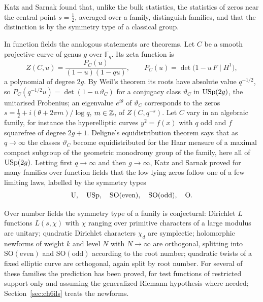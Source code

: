 Katz and Sarnak \cite{katzsarnak1999,katzsarnak1999b} found that, unlike the bulk statistics, the statistics of zeros near the central point $s=\frac12$, averaged over a family, distinguish families, and that the distinction is by the symmetry type of a classical group.

In function fields the analogous statements are theorems. Let $C$ be a smooth projective curve of genus $g$ over $\mathbb{F}_q$. Its zeta function is
\[
Z(C,u)=\frac{P_C(u)}{(1-u)(1-qu)},\qquad P_C(u)=\det\bigl(1-u\,F\mid H^1\bigr),
\]
a polynomial of degree $2g$. By Weil's theorem its roots have absolute value $q^{-1/2}$, so $P_C(q^{-1/2}u)=\det(1-u\,\vartheta_C)$ for a conjugacy class $\vartheta_C$ in $\mathrm{USp}(2g)$, the unitarised Frobenius; an eigenvalue $e^{i\theta}$ of $\vartheta_C$ corresponds to the zeros $s=\frac12+i(\theta+2\pi m)/\log q$, $m\in\mathbb{Z}$, of $Z(C,q^{-s})$. Let $C$ vary in an algebraic family, for instance the hyperelliptic curves $y^2=f(x)$ with $q$ odd and $f$ squarefree of degree $2g+1$. Deligne's equidistribution theorem \cite{deligne1980} says that as $q\to\infty$ the classes $\vartheta_C$ become equidistributed for the Haar measure of a maximal compact subgroup of the geometric monodromy group of the family, here all of $\mathrm{USp}(2g)$. Letting first $q\to\infty$ and then $g\to\infty$, Katz and Sarnak proved for many families over function fields that the low lying zeros follow one of a few limiting laws, labelled by the symmetry types
\[
\mathrm{U},\quad\mathrm{USp},\quad\mathrm{SO(even)},\quad\mathrm{SO(odd)},\quad\mathrm{O}.
\]

Over number fields the symmetry type of a family is conjectural: Dirichlet $L$ functions $L(s,\chi)$ with $\chi$ ranging over primitive characters of a large modulus are unitary; quadratic Dirichlet characters $\chi_d$ are symplectic; holomorphic newforms of weight $k$ and level $N$ with $N\to\infty$ are orthogonal, splitting into $\mathrm{SO(even)}$ and $\mathrm{SO(odd)}$ according to the root number; quadratic twists of a fixed elliptic curve are orthogonal, again split by root number. For several of these families the prediction has been proved, for test functions of restricted support only and assuming the generalized Riemann hypothesis where needed; Section~\ref{sec:ch6ils} treats the newforms.

